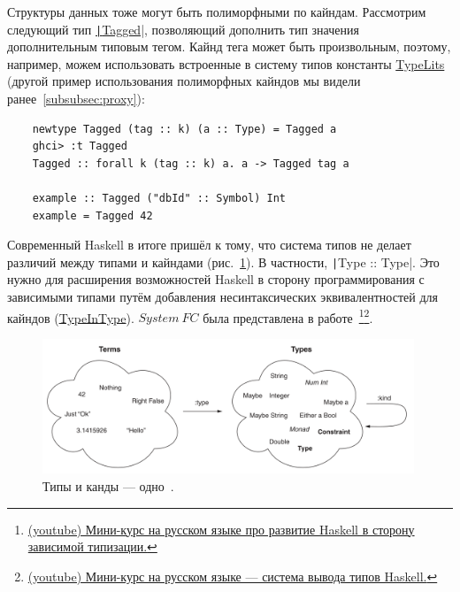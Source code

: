 Структуры данных тоже могут быть полиморфными по кайндам.
Рассмотрим следующий тип \href{https://hackage.haskell.org/package/tagged-0.8.8/docs/Data-Tagged.html#t:Tagged}{\texttt|Tagged|}, позволяющий дополнить тип значения дополнительным типовым тегом.
Кайнд тега может быть произвольным, поэтому, например, можем использовать встроенные в систему типов константы \href{https://ghc.gitlab.haskell.org/ghc/doc/users_guide/exts/type_literals.html}{TypeLits} (другой пример использования полиморфных кайндов мы видели ранее\ \ref{subsubsec:proxy}):
\begin{verbatim}
    newtype Tagged (tag :: k) (a :: Type) = Tagged a
    ghci> :t Tagged
    Tagged :: forall k (tag :: k) a. a -> Tagged tag a

    example :: Tagged ("dbId" :: Symbol) Int
    example = Tagged 42
\end{verbatim}

Современный Haskell в итоге пришёл к тому, что система типов не делает различий между типами и кайндами (рис.~\ref{fig:types-eq-kinds}).
В частности, \texttt|Type :: Type|.
Это нужно для расширения возможностей Haskell в сторону программирования с зависимыми типами путём добавления несинтаксических эквивалентностей для кайндов (\href{https://ghc.gitlab.haskell.org/ghc/doc/users_guide/exts/poly_kinds.html#extension-TypeInType}{TypeInType}).
$System~FC$ была представлена в работе~\cite{weirich2013system}\footnote{\href{https://www.youtube.com/watch?v=ISGENChlA4M&list=PLvPsfYrGz3wufQguebnCduYgQQ9UMeJRt}{(youtube) Мини-курс на русском языке про развитие Haskell в сторону зависимой типизации.}}\footnote{\href{https://www.youtube.com/watch?v=_HYI7zjkrEs&list=PLvPsfYrGz3wuVAGhNf6-i7uafXg56oqM5&index=1}{(youtube) Мини-курс на русском языке --- система вывода типов Haskell.}}. %

\begin{figure}[h]
    \centering
    \includegraphics[width=0.99\textwidth]{figs/types-eq-kinds}
    \caption{Типы и канды --- одно~\cite{bragilevsky-haskell}.}
    \label{fig:types-eq-kinds}
\end{figure}

